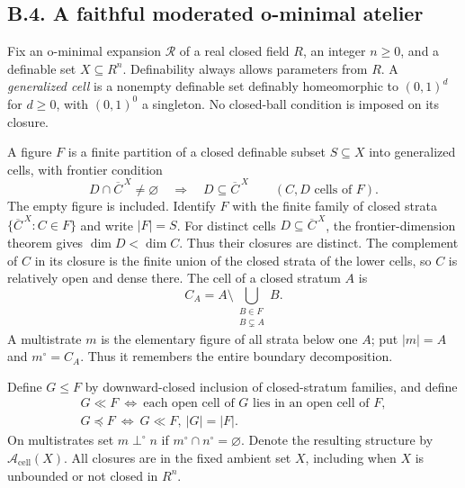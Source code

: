 \subsection{B.4. A faithful moderated o-minimal atelier}

\begin{definition}\label{SA21-BM-cell-definition}
Fix an o-minimal expansion \(\mathcal R\) of a real closed field \(R\),
an integer \(n\geq0\), and a definable set \(X\subseteq R^n\).
Definability always allows parameters from \(R\).
A \emph{generalized cell} is a nonempty definable set definably
homeomorphic to \((0,1)^d\) for \(d\geq0\), with \((0,1)^0\)
a singleton. No closed-ball condition is imposed on its closure.

A figure \(F\) is a finite partition of a closed definable
subset \(S\subseteq X\) into generalized cells, with frontier condition
\[
 D\cap\overline C^{\,X}\ne\varnothing
 \quad\Longrightarrow\quad D\subseteq\overline C^{\,X}
 \qquad(C,D\text{ cells of }F).
\]
The empty figure is included. Identify \(F\) with the finite
family of closed strata \(\{\overline C^{\,X}:C\in F\}\)
and write \(|F|=S\). For distinct cells \(D\subseteq\overline C^{\,X}\),
the frontier-dimension theorem
\citep[Theorem 3.22]{Coste1999} gives \(\dim D<\dim C\).
Thus their closures are distinct. The complement of \(C\)
in its closure is the finite union of the closed strata of
the lower cells, so \(C\) is relatively open and dense there.
The cell of a closed stratum \(A\) is
\[
 C_A=A\setminus\bigcup_{\substack{B\in F\\B\subsetneq A}}B.
\]
A multistrate \(m\) is the elementary figure of all strata
below one \(A\); put \(|m|=A\) and \(m^\circ=C_A\).
Thus it remembers the entire boundary decomposition.

Define \(G\leq F\) by downward-closed inclusion of closed-stratum
families, and define
\[
\begin{gathered}
 G\ll F\ \Longleftrightarrow\
 \text{each open cell of }G\text{ lies in an open cell of }F,\\
 G\preceq F\ \Longleftrightarrow\ G\ll F,\ |G|=|F|.
\end{gathered}
\]
On multistrates set \(m\perp^\circ n\) if
\(m^\circ\cap n^\circ=\varnothing\). Denote the resulting
structure by \(\mathcal A_{\mathrm{cell}}(X)\).
All closures are in the fixed ambient set \(X\), including
when \(X\) is unbounded or not closed in \(R^n\).
\end{definition}

